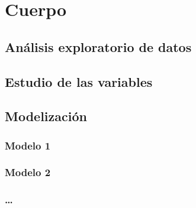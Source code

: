 \documentclass[12pt,a4paper,]{book}
\def\ifdoblecara{} %
\def\ifprincipal{} %
\numberwithin{dummy}{section}
\theoremstyle{ocrenumbox}
\theoremstyle{blacknumex}
\theoremstyle{blacknumbox}
\theoremstyle{ocrenum}
\theoremstyle{ocrenum}
\begin{document}
\ifdefined\ifprincipal
\else
\setlength{\parindent}{1em}
\pagestyle{fancy}
\setcounter{tocdepth}{4}
\tableofcontents

\fi

\ifdefined\ifdoblecara
\fancyhead{}{}
\fancyhead[LE,RO]{\scriptsize\rightmark}
\fancyfoot[LO,RE]{\scriptsize\slshape \leftmark}
\fancyfoot[C]{}
\fancyfoot[LE,RO]{\footnotesize\thepage}
\else
\fancyhead{}{}
\fancyhead[RO]{\scriptsize\rightmark}
\fancyfoot[LO]{\scriptsize\slshape \leftmark}
\fancyfoot[C]{}
\fancyfoot[RO]{\footnotesize\thepage}
\fi

\renewcommand{\headrulewidth}{0.4pt}
\renewcommand{\footrulewidth}{0.4pt}

\hypertarget{cuerpo}{%
\chapter{Cuerpo}\label{cuerpo}}

\hypertarget{anuxe1lisis-exploratorio-de-datos-1}{%
\section{Análisis exploratorio de
datos}\label{anuxe1lisis-exploratorio-de-datos-1}}

\hypertarget{estudio-de-las-variables}{%
\section{Estudio de las variables}\label{estudio-de-las-variables}}

\hypertarget{modelizaciuxf3n}{%
\section{Modelización}\label{modelizaciuxf3n}}

\hypertarget{modelo-1}{%
\subsection{Modelo 1}\label{modelo-1}}

\hypertarget{modelo-2}{%
\subsection{Modelo 2}\label{modelo-2}}

\hypertarget{section}{%
\subsection{\ldots{}}\label{section}}
\end{document}
